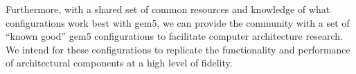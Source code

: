 Furthermore, with a shared set of common resources and knowledge of what
configurations work best with gem5, we can provide the community with a set of
``known good'' gem5 configurations to facilitate computer architecture
research. We intend for these configurations to replicate the functionality and
performance of architectural components at a high level of fidelity.

